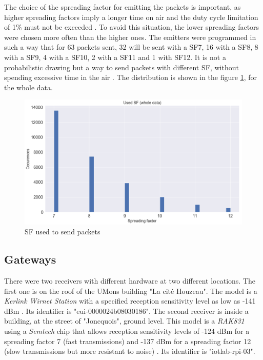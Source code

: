 \documentclass[letterpaper, 10 pt, conference]{ieeeconf}  %
\begin{document}
The choice of the spreading factor for emitting the packets is important, as higher spreading factors imply a longer time on air and the duty cycle limitation of 1\% must not be exceeded \cite{c13}. To avoid this situation, the lower spreading factors were chosen more often than the higher ones. The emitters were programmed in such a way that for 63 packets sent, 32 will be sent with a SF7, 16 with a SF8, 8 with a SF9, 4 with a SF10, 2 with a SF11 and 1 with SF12. It is not a probabilistic drawing but a way to send packets with different SF, without spending excessive time in the air \cite{c2}. The distribution is shown in the figure \ref{sf_packet_count}, for the whole data.

\begin{figure}[ht!]
\centering
\includegraphics[scale=0.24]{sf_count.png}
\caption{SF used to send packets}
\label{sf_packet_count}
\end{figure}

\subsection{Gateways}

There were two receivers with different hardware at two different locations. The first one is on the roof of the UMons building "La cit\'e Houzeau". The model is a \textit{Kerlink Wirnet Station} with a specified reception sensitivity level as low as -141 dBm \cite{c7}. Its identifier is "eui-0000024b08030186". The second receiver is inside a building, at the street of "Joncquois", ground level. This model is a \textit{RAK831} using a \textit{Semtech} chip that allows reception sensitivity levels of -124 dBm for a spreading factor 7 (fast transmissions) and -137 dBm for a spreading factor 12 (slow transmissions but more resistant to noise) \cite{c8}. Its identifier is "iotlab-rpi-03".
\end{document}
